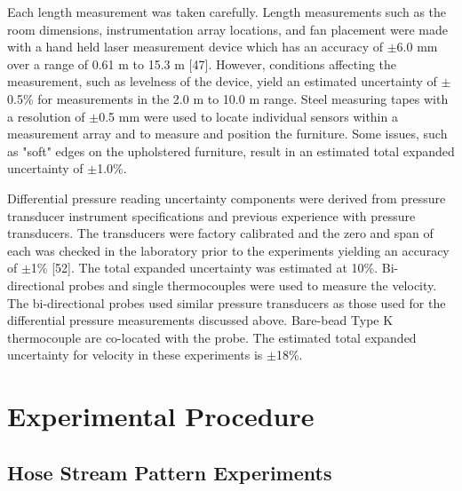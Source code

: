 \documentclass[12pt,oneside]{book}
\begin{document}
Each length measurement was taken carefully. Length measurements such as the room dimensions,
instrumentation array locations, and fan placement were made with a hand held laser measurement
device which has an accuracy of $\pm$6.0 mm over a range of 0.61 m to 15.3 m [47]. However, conditions affecting the measurement, such as levelness of the device, yield an
estimated uncertainty of $\pm$0.5\% for measurements in the 2.0 m to 10.0 m range. Steel measuring tapes with a resolution of $\pm$0.5 mm were used to locate individual sensors within a measurement array and to measure and position the furniture. Some issues, such as "soft" edges on the upholstered furniture, result in an estimated total expanded uncertainty of $\pm$1.0\%. 

Differential pressure reading uncertainty components were derived from pressure transducer instrument specifications and previous experience with pressure transducers. The transducers were factory calibrated and the zero and span of each was checked in the laboratory prior to the experiments yielding an accuracy of $\pm$1\% [52]. The total expanded uncertainty was estimated at 10\%. Bi-directional probes and single thermocouples were used to measure the velocity. The bi-directional probes used similar pressure transducers as those used for the differential pressure measurements discussed above. Bare-bead Type K thermocouple are co-located with the probe. The estimated total expanded uncertainty for velocity in these experiments is $\pm$18\%. 


\section{Experimental Procedure}
\label{sec:Experimental_Procedure}

\subsection{Hose Stream Pattern Experiments}
\label{sec:Hose_Stream_Pattern_Experiments}
\end{document}
